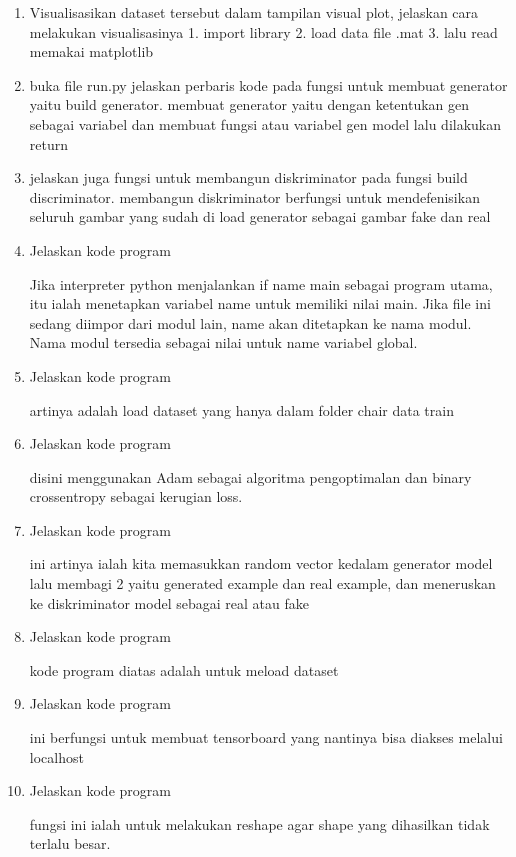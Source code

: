 \begin{enumerate}
\item Visualisasikan dataset tersebut dalam tampilan visual plot, jelaskan cara melakukan visualisasinya
1. import library 2. load data file .mat 3. lalu read memakai matplotlib

\item buka file run.py jelaskan perbaris kode pada fungsi untuk membuat generator yaitu build generator.
membuat generator yaitu dengan ketentukan gen sebagai variabel dan membuat fungsi atau variabel gen model lalu dilakukan return

\item jelaskan juga fungsi untuk membangun diskriminator pada fungsi build discriminator.
membangun diskriminator berfungsi untuk mendefenisikan seluruh gambar yang sudah di load generator sebagai gambar fake dan real

\item Jelaskan kode program

Jika interpreter python menjalankan if name main sebagai program utama, itu ialah menetapkan variabel name untuk memiliki nilai main. Jika file ini sedang diimpor dari modul lain, name akan ditetapkan ke nama modul. Nama modul tersedia sebagai nilai untuk name variabel global.

\item Jelaskan kode program 

artinya adalah load dataset yang hanya dalam folder chair data train

\item Jelaskan kode program 

disini menggunakan Adam sebagai algoritma pengoptimalan dan binary crossentropy sebagai kerugian loss. 

\item Jelaskan kode program 

ini artinya ialah kita memasukkan random vector kedalam generator model lalu membagi 2 yaitu generated example dan real example, dan meneruskan ke diskriminator model sebagai real atau fake

\item Jelaskan kode program 

kode program diatas adalah untuk meload dataset

\item Jelaskan kode program 

ini berfungsi untuk membuat tensorboard yang nantinya bisa diakses melalui localhost

\item Jelaskan kode program 

fungsi ini ialah untuk melakukan reshape agar shape yang dihasilkan tidak terlalu besar.


\end{enumerate}
